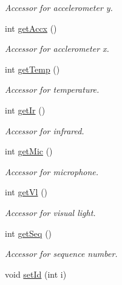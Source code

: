 \begin{DoxyCompactItemize}
\begin{DoxyCompactList}\small\item\em Accessor for accelerometer y. \item\end{DoxyCompactList}\item 
int \hyperlink{classMoteReading_ad79a65f84dfaacc9b5c179fb66a5545f}{getAccx} ()
\begin{DoxyCompactList}\small\item\em Accessor for acclerometer x. \item\end{DoxyCompactList}\item 
int \hyperlink{classMoteReading_a3f7526c29f2bf61feeb5e24298133332}{getTemp} ()
\begin{DoxyCompactList}\small\item\em Accessor for temperature. \item\end{DoxyCompactList}\item 
int \hyperlink{classMoteReading_aff0d87f9c667d01f7e37a114afa321fa}{getIr} ()
\begin{DoxyCompactList}\small\item\em Accessor for infrared. \item\end{DoxyCompactList}\item 
int \hyperlink{classMoteReading_a348cb45f4613499385a354fe6857ef5d}{getMic} ()
\begin{DoxyCompactList}\small\item\em Accessor for microphone. \item\end{DoxyCompactList}\item 
int \hyperlink{classMoteReading_a88ed6ea245c7af79e38ff8976f849f36}{getVl} ()
\begin{DoxyCompactList}\small\item\em Accessor for visual light. \item\end{DoxyCompactList}\item 
int \hyperlink{classMoteReading_a7164d52474f2541952d44926cc79671d}{getSeq} ()
\begin{DoxyCompactList}\small\item\em Accessor for sequence number. \item\end{DoxyCompactList}\item 
void \hyperlink{classMoteReading_a61f08f015a9f833ff7352c378b7799c2}{setId} (int i)

\end{DoxyCompactItemize}
